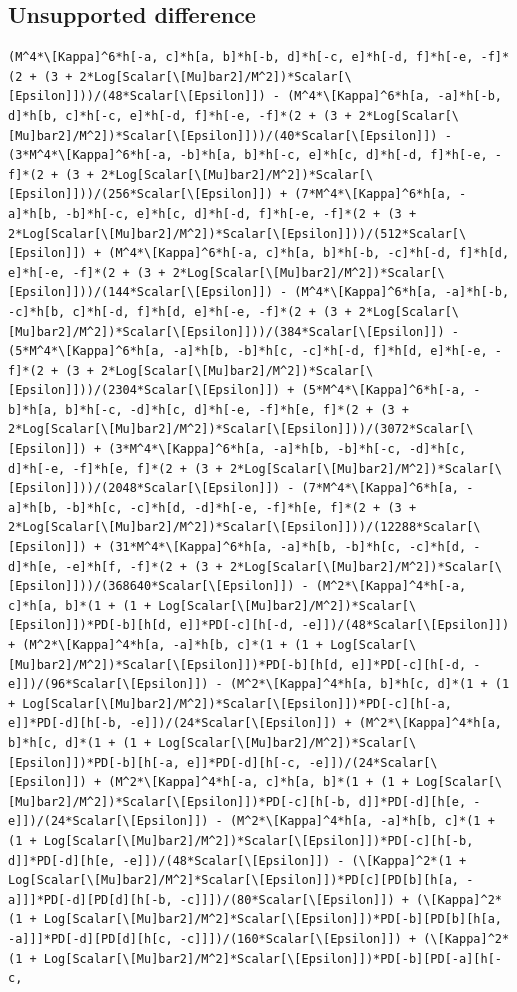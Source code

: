 \documentclass[11pt]{article}
\begin{document}
\subsection{Unsupported difference}
\begin{verbatim}
(M^4*\[Kappa]^6*h[-a, c]*h[a, b]*h[-b, d]*h[-c, e]*h[-d, f]*h[-e, -f]*(2 + (3 + 2*Log[Scalar[\[Mu]bar2]/M^2])*Scalar[\[Epsilon]]))/(48*Scalar[\[Epsilon]]) - (M^4*\[Kappa]^6*h[a, -a]*h[-b, d]*h[b, c]*h[-c, e]*h[-d, f]*h[-e, -f]*(2 + (3 + 2*Log[Scalar[\[Mu]bar2]/M^2])*Scalar[\[Epsilon]]))/(40*Scalar[\[Epsilon]]) - (3*M^4*\[Kappa]^6*h[-a, -b]*h[a, b]*h[-c, e]*h[c, d]*h[-d, f]*h[-e, -f]*(2 + (3 + 2*Log[Scalar[\[Mu]bar2]/M^2])*Scalar[\[Epsilon]]))/(256*Scalar[\[Epsilon]]) + (7*M^4*\[Kappa]^6*h[a, -a]*h[b, -b]*h[-c, e]*h[c, d]*h[-d, f]*h[-e, -f]*(2 + (3 + 2*Log[Scalar[\[Mu]bar2]/M^2])*Scalar[\[Epsilon]]))/(512*Scalar[\[Epsilon]]) + (M^4*\[Kappa]^6*h[-a, c]*h[a, b]*h[-b, -c]*h[-d, f]*h[d, e]*h[-e, -f]*(2 + (3 + 2*Log[Scalar[\[Mu]bar2]/M^2])*Scalar[\[Epsilon]]))/(144*Scalar[\[Epsilon]]) - (M^4*\[Kappa]^6*h[a, -a]*h[-b, -c]*h[b, c]*h[-d, f]*h[d, e]*h[-e, -f]*(2 + (3 + 2*Log[Scalar[\[Mu]bar2]/M^2])*Scalar[\[Epsilon]]))/(384*Scalar[\[Epsilon]]) - (5*M^4*\[Kappa]^6*h[a, -a]*h[b, -b]*h[c, -c]*h[-d, f]*h[d, e]*h[-e, -f]*(2 + (3 + 2*Log[Scalar[\[Mu]bar2]/M^2])*Scalar[\[Epsilon]]))/(2304*Scalar[\[Epsilon]]) + (5*M^4*\[Kappa]^6*h[-a, -b]*h[a, b]*h[-c, -d]*h[c, d]*h[-e, -f]*h[e, f]*(2 + (3 + 2*Log[Scalar[\[Mu]bar2]/M^2])*Scalar[\[Epsilon]]))/(3072*Scalar[\[Epsilon]]) + (3*M^4*\[Kappa]^6*h[a, -a]*h[b, -b]*h[-c, -d]*h[c, d]*h[-e, -f]*h[e, f]*(2 + (3 + 2*Log[Scalar[\[Mu]bar2]/M^2])*Scalar[\[Epsilon]]))/(2048*Scalar[\[Epsilon]]) - (7*M^4*\[Kappa]^6*h[a, -a]*h[b, -b]*h[c, -c]*h[d, -d]*h[-e, -f]*h[e, f]*(2 + (3 + 2*Log[Scalar[\[Mu]bar2]/M^2])*Scalar[\[Epsilon]]))/(12288*Scalar[\[Epsilon]]) + (31*M^4*\[Kappa]^6*h[a, -a]*h[b, -b]*h[c, -c]*h[d, -d]*h[e, -e]*h[f, -f]*(2 + (3 + 2*Log[Scalar[\[Mu]bar2]/M^2])*Scalar[\[Epsilon]]))/(368640*Scalar[\[Epsilon]]) - (M^2*\[Kappa]^4*h[-a, c]*h[a, b]*(1 + (1 + Log[Scalar[\[Mu]bar2]/M^2])*Scalar[\[Epsilon]])*PD[-b][h[d, e]]*PD[-c][h[-d, -e]])/(48*Scalar[\[Epsilon]]) + (M^2*\[Kappa]^4*h[a, -a]*h[b, c]*(1 + (1 + Log[Scalar[\[Mu]bar2]/M^2])*Scalar[\[Epsilon]])*PD[-b][h[d, e]]*PD[-c][h[-d, -e]])/(96*Scalar[\[Epsilon]]) - (M^2*\[Kappa]^4*h[a, b]*h[c, d]*(1 + (1 + Log[Scalar[\[Mu]bar2]/M^2])*Scalar[\[Epsilon]])*PD[-c][h[-a, e]]*PD[-d][h[-b, -e]])/(24*Scalar[\[Epsilon]]) + (M^2*\[Kappa]^4*h[a, b]*h[c, d]*(1 + (1 + Log[Scalar[\[Mu]bar2]/M^2])*Scalar[\[Epsilon]])*PD[-b][h[-a, e]]*PD[-d][h[-c, -e]])/(24*Scalar[\[Epsilon]]) + (M^2*\[Kappa]^4*h[-a, c]*h[a, b]*(1 + (1 + Log[Scalar[\[Mu]bar2]/M^2])*Scalar[\[Epsilon]])*PD[-c][h[-b, d]]*PD[-d][h[e, -e]])/(24*Scalar[\[Epsilon]]) - (M^2*\[Kappa]^4*h[a, -a]*h[b, c]*(1 + (1 + Log[Scalar[\[Mu]bar2]/M^2])*Scalar[\[Epsilon]])*PD[-c][h[-b, d]]*PD[-d][h[e, -e]])/(48*Scalar[\[Epsilon]]) - (\[Kappa]^2*(1 + Log[Scalar[\[Mu]bar2]/M^2]*Scalar[\[Epsilon]])*PD[c][PD[b][h[a, -a]]]*PD[-d][PD[d][h[-b, -c]]])/(80*Scalar[\[Epsilon]]) + (\[Kappa]^2*(1 + Log[Scalar[\[Mu]bar2]/M^2]*Scalar[\[Epsilon]])*PD[-b][PD[b][h[a, -a]]]*PD[-d][PD[d][h[c, -c]]])/(160*Scalar[\[Epsilon]]) + (\[Kappa]^2*(1 + Log[Scalar[\[Mu]bar2]/M^2]*Scalar[\[Epsilon]])*PD[-b][PD[-a][h[-c, 
\end{verbatim}
\end{document}
